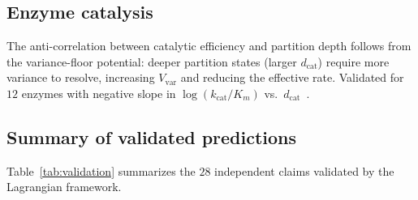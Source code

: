 \documentclass[twocolumn,aps,prl,superscriptaddress,floatfix]{revtex4-2}
\begin{document}
\subsection{Enzyme catalysis}

The anti-correlation between catalytic efficiency and partition depth follows from the variance-floor potential: deeper partition states (larger $d_{\mathrm{cat}}$) require more variance to resolve, increasing $V_{\mathrm{var}}$ and reducing the effective rate.
Validated for $12$ enzymes with negative slope in $\log(k_{\mathrm{cat}}/K_m)$ vs.\ $d_{\mathrm{cat}}$~\cite{sachikonye2026aperture}.

\subsection{Summary of validated predictions}

Table~\ref{tab:validation} summarizes the $28$ independent claims validated by the Lagrangian framework.
\end{document}
